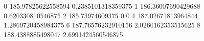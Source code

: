 0 185.97825622558594 0.2385101318359375
1 186.36007690429688 0.620330810546875
2 185.73974609375 0.0
4 187.02671813964844 1.2869720458984375
6 187.76576232910156 2.0260162353515625
8 188.4388885498047 2.6991424560546875
